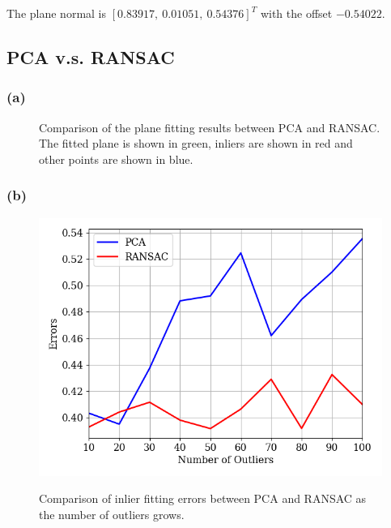 \documentclass{article}
\theoremstyle{definition} %
\begin{document}
The plane normal is $[0.83917,\ 0.01051,\ 0.54376]^T$ with the offset $-0.54022$.


\subsection*{PCA v.s. RANSAC}

\subsubsection*{(a)}

\begin{figure}[H]
    \centering
    \quad
    \caption{Comparison of the plane fitting results between PCA and RANSAC. The fitted plane is shown in green, inliers are shown in red and other points are shown in blue.}
    \label{fig:plane_pca_ransac}
\end{figure}


\subsubsection*{(b)}
\begin{figure}[H]
    \centering
        \textsf{\includegraphics[width=0.6\columnwidth]{pca_vs_ransac.png}}
        \caption{Comparison of inlier fitting errors between PCA and RANSAC as the number of outliers grows.}
        \label{fig:err_pca_ransac}
\end{figure}
\end{document}
